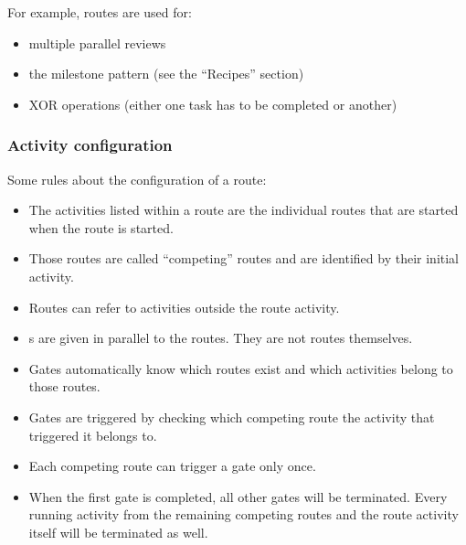 For example, routes are used for:

\begin{itemize}
    \item multiple parallel reviews
    \item the milestone pattern (see the ``Recipes'' section)
    \item XOR operations (either one task has to be completed or another)
\end{itemize}

\subsubsection{Activity configuration}

Some rules about the configuration of a route:

\begin{itemize}
    \item The activities listed within a route are the individual routes that are started when the route is started.
    \item Those routes are called ``competing'' routes and are identified by their initial activity.
    \item Routes can refer to activities outside the route activity.
    \item {}s are given in parallel to the routes. They are not routes themselves.
    \item Gates automatically know which routes exist and which activities belong to those routes.
    \item Gates are triggered by checking which competing route the activity that triggered it belongs to.
    \item Each competing route can trigger a gate only once.
    \item When the first gate is completed, all other gates will be terminated. Every running activity 
        from the remaining competing routes and the route activity itself will be terminated as well.
\end{itemize}
        
